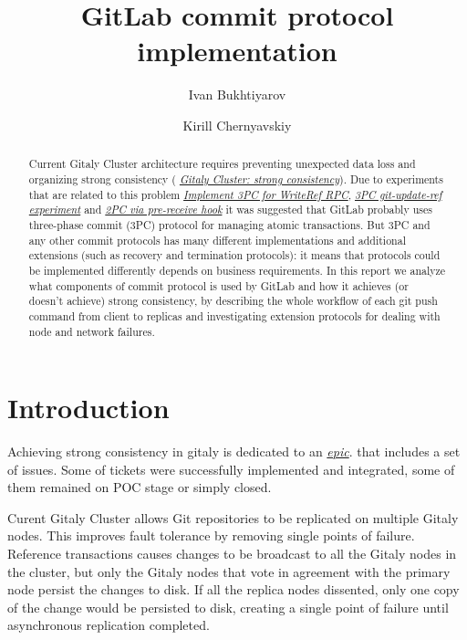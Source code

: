 \documentclass[acmlarge, screen, nonacm]{acmart}
\title{GitLab commit protocol implementation}
\author{Ivan Bukhtiyarov}
\author{Kirill Chernyavskiy}
\begin{document}
\begin{abstract}
  Current Gitaly Cluster architecture requires preventing unexpected data loss and organizing strong consistency (
  \emph{\href{https://gitlab.com/groups/gitlab-org/-/epics/1189}{Gitaly Cluster: strong consistency}}).
  Due to experiments that are related to this problem
  \emph{\href{https://gitlab.com/gitlab-org/gitaly/-/issues/2466}{Implement 3PC for WriteRef RPC}},
  \emph{\href{https://gitlab.com/gitlab-org/gitaly/-/issues/2529}{3PC git-update-ref experiment}} and
  \emph{\href{https://gitlab.com/gitlab-org/gitaly/-/issues/2635}{2PC via pre-receive hook}}
  it was suggested that GitLab probably uses three-phase commit (3PC) protocol for managing atomic transactions. 
  But 3PC and any other commit protocols has many different implementations and
  additional extensions (such as recovery and termination protocols): it means that protocols could
  be implemented differently depends on business requirements. In this report we analyze what
  components of commit protocol is used by GitLab and how it achieves (or doesn't achieve) 
  strong consistency, by describing the whole workflow of each git push command from 
  client to replicas and investigating extension protocols for dealing with node and network failures.
\end{abstract}

\maketitle

\section{Introduction}
  Achieving strong consistency in gitaly is dedicated to an
  \emph{\href{https://gitlab.com/groups/gitlab-org/-/epics/1189}{epic}}. 
  that includes a set of issues. Some of tickets were successfully implemented and integrated,
  some of them remained on POC stage or simply closed.
  
  Curent Gitaly Cluster allows Git repositories to be replicated on multiple Gitaly nodes. 
  This improves fault tolerance by removing single points of failure. 
  Reference transactions causes changes to be broadcast to all the Gitaly nodes in the cluster, 
  but only the Gitaly nodes that vote in agreement with the primary node persist the changes to disk. 
  If all the replica nodes dissented, only one copy of the change would be persisted to disk, 
  creating a single point of failure until asynchronous replication completed.
\end{document}
